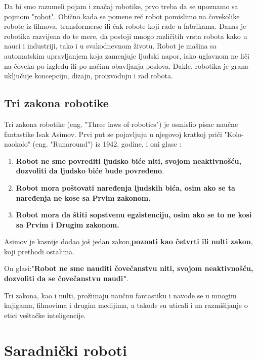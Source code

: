 \documentclass{report}
\begin{document}
	
	
	Da bi smo razumeli pojam i značaj robotike, prvo treba da se upoznamo sa pojmom \href{https://www.sciencefriday.com/segments/the-origin-of-the-word-robot/}{"robot"}.
	Obično kada se pomene reč robot pomislimo na čovekolike robote iz filmova, transformerse ili čak robote koji rade u fabrikama. Danas je robotika razvijena do te mere, da postoji mnogo različitih vrsta robota kako u nauci i industriji, tako i u svakodnevnom životu. Robot je mašina sa automatskim upravljanjem koja zamenjuje ljudski napor, iako uglavnom ne liči na čoveka po izgledu ili po načinu obavljanja poslova. Dakle, robotika je grana uključuje koncepciju, dizajn, proizvodnju i rad robota. \cite{robots in nowdays}
	
	\section{Tri zakona robotike}
	Tri zakona robotike (eng. "Three laws of robotics") je osmislio pisac naučne fantastike Isak Asimov. Prvi put se pojavljuju u njegovoj kratkoj priči "Kolo-naokolo" (eng. "Runaround") iz 1942. godine, i oni glase \cite{three laws of robotics, runaround}:
	\begin{enumerate}
	\item \textbf{Robot ne sme povrediti ljudsko biće niti, svojom neaktivnošću, dozvoliti da ljudsko biće bude povređeno}.
	
	\item \textbf{Robot mora poštovati naređenja ljudskih bića, osim ako se ta naređenja ne kose sa Prvim zakonom.}
	
	\item \textbf{Robot mora da štiti sopstvenu egzistenciju, osim ako se to ne kosi sa Prvim i Drugim zakonom.}
	\end{enumerate}
	
	Asimov je kasnije dodao još jedan zakon,\textbf{poznati kao četvrti ili nulti zakon}, koji prethodi ostalima.\par
	
	On glasi:"\textbf{Robot ne sme nauditi čovečanstvu niti, svojom neaktivnošću, dozvoliti da se čovečanstvu naudi"}.\par
	Tri zakona, kao i nulti, prožimaju naučnu fantastiku i navode se u mnogim knjigama, filmovima i drugim medijima, a takođe su uticali i na razmišljanje o etici veštačke inteligencije. \cite{three laws of robotics}
	
	
	
	
	\chapter{Saradnički roboti}
	
\end{document}
